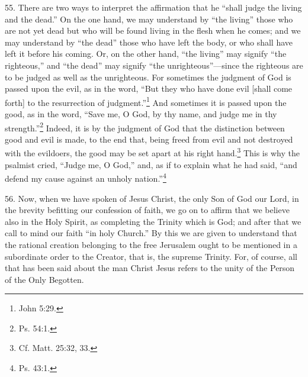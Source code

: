 55. There are two ways to interpret the affirmation that he ``shall judge the living and the dead.'' On the one hand, we may understand by ``the living'' those who are not yet dead but who will be found living in the flesh when he comes; and we may understand by ``the dead'' those who have left the body, or who shall have left it before his coming. Or, on the other hand, ``the living'' may signify ``the righteous,'' and ``the dead'' may signify ``the unrighteous''—since the righteous are to be judged as well as the unrighteous. For sometimes the judgment of God is passed upon the evil, as in the word, ``But they who have done evil [shall come forth] to the resurrection of judgment.''\footnote{John 5:29.} And sometimes it is passed upon the good, as in the word, ``Save me, O God, by thy name, and judge me in thy strength.''\footnote{Ps. 54:1.} Indeed, it is by the judgment of God that the distinction between good and evil is made, to the end that, being freed from evil and not destroyed with the evildoers, the good may be set apart at his right hand.\footnote{Cf. Matt. 25:32, 33.} This is why the psalmist cried, ``Judge me, O God,'' and, as if to explain what he had said, ``and defend my cause against an unholy nation.''\footnote{Ps. 43:1.}


56. Now, when we have spoken of Jesus Christ, the only Son of God our Lord, in the brevity befitting our confession of faith, we go on to affirm that we believe also in the Holy Spirit, as completing the Trinity which is God; and after that we call to mind our faith ``in holy Church.'' By this we are given to understand that the rational creation belonging to the free Jerusalem ought to be mentioned in a subordinate order to the Creator, that is, the supreme Trinity. For, of course, all that has been said about the man Christ Jesus refers to the unity of the Person of the Only Begotten.

